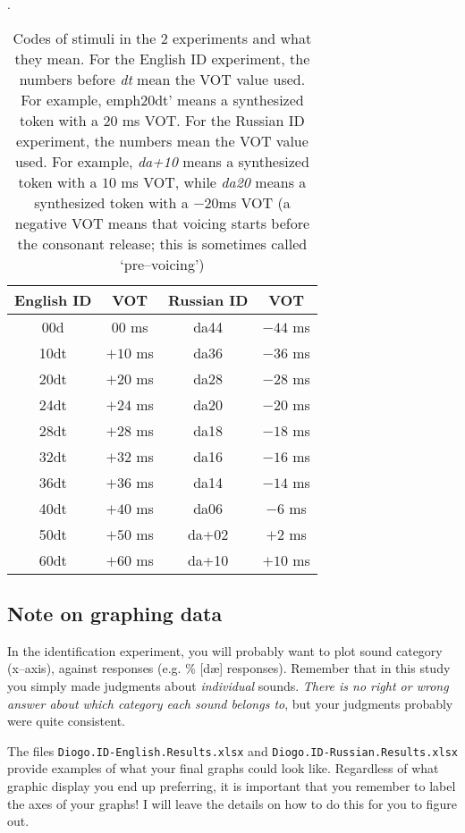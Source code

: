 \documentclass{article}
\newcommand{\filefmat}[1]{\texttt{#1}}
\begin{document}
\begin{table}[!tbp]
\caption{Codes of stimuli in the 2 experiments and what they mean. For the English ID  experiment, the numbers before \emph{dt} mean the VOT value used. For example, emph{20dt}' means a synthesized token with a 20 ms VOT. For the Russian ID experiment, the numbers mean the VOT value used. For example, \emph{da+10} means a synthesized token with a $10$ ms VOT, while \emph{da20} means a synthesized token with a $-20$ms VOT (a negative VOT means that voicing starts before the consonant release; this is sometimes called `pre--voicing')}.
\label{conditions}
	\begin{tabular}{cccc}
\\	\toprule
English ID & VOT & Russian ID & VOT\\
\midrule
00d & $00$ ms & da44   & $-44$ ms \\
10dt & $+10$ ms & da36   & $-36$ ms    \\
20dt & $+20$ ms & da28   & $-28$ ms     \\
24dt & $+24$ ms & da20   & $-20$ ms   \\
28dt & $+28$ ms & da18   & $-18$ ms   \\
32dt & $+32$ ms & da16   & $-16$ ms   \\
36dt & $+36$ ms & da14   & $-14$ ms   \\
40dt & $+40$ ms & da06   & $-6$ ms   \\
50dt & $+50$ ms & da+02   & $+2$ ms   \\
60dt & $+60$ ms & da+10   & $+10$ ms \\
        \bottomrule
        	\end{tabular}
\end{table}

\subsection{Note on graphing data}

In the identification experiment, you will probably want to plot sound category (x--axis), against responses (e.g. \% [d\ae{}] responses). Remember that in this study you simply made judgments about \emph{individual}  sounds. \emph{There is no right or wrong answer about which category each sound belongs to}, but your judgments probably were quite consistent.
 
The files \filefmat{Diogo.ID-English.Results.xlsx} and \filefmat{Diogo.ID-Russian.Results.xlsx} provide examples of what your final graphs could look like. Regardless of what graphic display you end up preferring, it is important that you remember to label the axes of your graphs! I will leave the details on how to do this for you to figure out.
\end{document}
